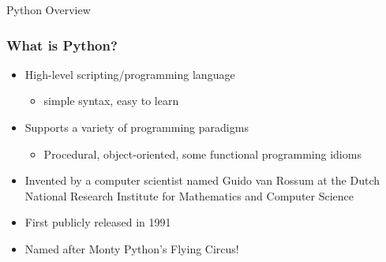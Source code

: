 \documentclass{beamer}
\begin{document}
\begin{frame}

\begin{center}
\LARGE{Python Overview}

\end{center}
\end{frame}

\begin{frame}
  \frametitle{What is Python?}
\begin{itemize}

\item High-level scripting/programming language
\begin{itemize}
	\item simple syntax, easy to learn
\end{itemize}

\item Supports a variety of programming paradigms
	\begin{itemize}
		\item Procedural, object-oriented, some functional programming idioms
	\end{itemize}

\item Invented by a computer scientist named Guido van Rossum at the Dutch National Research Institute for Mathematics and Computer Science

\item First publicly released in 1991

\item Named after Monty Python's Flying Circus!
\end{itemize}

\end{frame}
\end{document}
